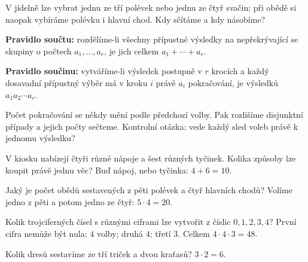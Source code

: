 \documentclass[11pt,a4paper]{article}
\begin{document}

V jídelně lze vybrat jednu ze tří polévek nebo jednu ze čtyř svačin; při obědě si naopak vybíráme polévku i hlavní chod. Kdy sčítáme a kdy násobíme?



\begin{definiceBox}
\textbf{Pravidlo součtu:} rozdělíme-li všechny přípustné výsledky na nepřekrývající se skupiny o počtech $a_1,\ldots,a_r$, je jich celkem $a_1+\cdots+a_r$.
\end{definiceBox}
\begin{definiceBox}
\textbf{Pravidlo součinu:} vytváříme-li výsledek postupně v $r$ krocích a každý dosavadní přípustný výběr má v kroku $i$ právě $a_i$ pokračování, je výsledků $a_1a_2\cdots a_r$.
\end{definiceBox}
Počet pokračování se někdy mění podle předchozí volby. Pak rozlišíme disjunktní případy a jejich počty sečteme. Kontrolní otázka: vede každý sled voleb právě k jednomu výsledku?


\begin{prikladReseniBox}[title={Příklad 1}]
V kiosku nabízejí čtyři různé nápoje a šest různých tyčinek. Kolika způsoby lze koupit právě jednu věc?
\tcblower
Buď nápoj, nebo tyčinka: $4+6=10$.
\end{prikladReseniBox}



\begin{prikladReseniBox}[title={Příklad 2}]
Jaký je počet obědů sestavených z pěti polévek a čtyř hlavních chodů?
\tcblower
Volíme jedno z pěti a potom jedno ze čtyř: $5\cdot4=20$.
\end{prikladReseniBox}



\begin{prikladReseniBox}[title={Příklad 3}]
Kolik trojciferných čísel s různými ciframi lze vytvořit z číslic $0,1,2,3,4$?
\tcblower
První cifra nemůže být nula: $4$ volby; druhá $4$; třetí $3$. Celkem $4\cdot4\cdot3=48$.
\end{prikladReseniBox}




\begin{zadaniReseniBox}[title={Samostatná práce 1}]
Kolik dresů sestavíme ze tří triček a dvou kraťasů?
\tcblower
$3\cdot2=6$.
\end{zadaniReseniBox}
\end{document}
